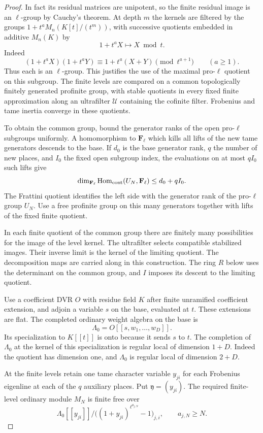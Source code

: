 \begin{proof}
In fact its
residual matrices are unipotent, so the finite residual
image is an \(\ell\)-group by Cauchy's theorem. At depth \(m\) the kernels are filtered by the groups
\(1+t^aM_n(K[t]/(t^m))\), with successive quotients embedded in additive \(M_n(K)\) by
\[
 1+t^aX\mapsto X\bmod t.
\]
Indeed
\[
 (1+t^aX)(1+t^aY)\equiv1+t^a(X+Y)\pmod{t^{a+1}}
 \qquad (a\ge1).
\] Thus each is an \(\ell\)-group. This justifies the use of the
maximal pro-\(\ell\) quotient on this subgroup. The finite
levels are compared on a common topologically finitely
generated profinite group, with stable quotients in every
fixed finite approximation along an ultrafilter
\(\mathcal U\) containing the cofinite filter.
Frobenius and tame inertia converge in these quotients.

To obtain the common group,
bound the generator ranks of the open pro-\(\ell\)
subgroups uniformly. A homomorphism to \(\mathbf F_\ell\)
which kills all lifts of the new tame generators descends
to the base. If \(d_0\) is the base generator rank, \(q\) the number
of new places, and \(I_0\) the fixed open subgroup index,
the evaluations on at most \(qI_0\) such lifts give
\[
 \dim_{\mathbf F_\ell}\operatorname{Hom}_{\rm cont}
      (U_N,\mathbf F_\ell)\le d_0+qI_0 .
\]
The Frattini quotient identifies the left side with the
generator rank of the pro-\(\ell\) group \(U_N\).
Use a free profinite group on this many generators
together with lifts of the fixed finite quotient.

In each finite quotient of the common group there are
finitely many possibilities for the image of the level
kernel. The ultrafilter selects compatible stabilized
images. Their inverse limit is the kernel of the limiting
quotient. The decomposition maps are carried along in
this construction. The ring \(R\) below uses the
determinant on the common group, and \(I\) imposes
its descent to the limiting quotient.

Use a coefficient DVR \(O\) with residue field \(K\) after
finite unramified coefficient extension, and adjoin a variable
\(s\) on the base, evaluated at \(t\). These extensions are
flat. The completed ordinary weight algebra on the base is
\[
 \Lambda_0=O[[s,w_1,\ldots,w_D]].
\]
Its specialization to \(K[[t]]\) is onto because it sends
\(s\) to \(t\). The completion of \(\Lambda_0\) at the
kernel of this specialization is regular local of dimension
\(1+D\). Indeed the quotient has dimension one, and
\(\Lambda_0\) is regular local of dimension \(2+D\).

At the finite levels retain one tame character variable
\(y_{ji}\) for each Frobenius eigenline at each of the \(q\)
auxiliary places. Put \(\mathfrak y=(y_{ji})\). The required
finite-level ordinary module \(M_N\) is finite free over
\[
 \Lambda_0[[y_{ji}]]\Big/
 \bigl((1+y_{ji})^{\ell^{a_{j,N}}}-1\bigr)_{j,i},
 \qquad a_{j,N}\ge N .
\]


\end{proof}
